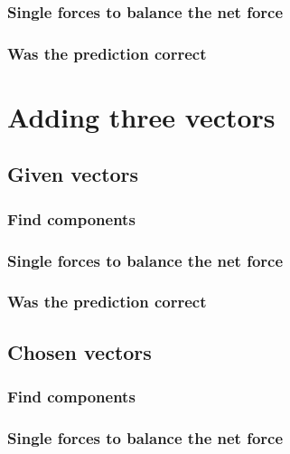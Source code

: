 \documentclass[11pt, letterpaper, includehead]{article}
\begin{document}
\subsubsection{Single forces to balance the net force} %

\subsubsection{Was the prediction correct} %

\section{Adding three vectors} %

\subsection{Given vectors} %

\subsubsection{Find components} %

\subsubsection{Single forces to balance the net force} %

\subsubsection{Was the prediction correct} %

\subsection{Chosen vectors} %

\subsubsection{Find components} %

\subsubsection{Single forces to balance the net force} %
\end{document}
